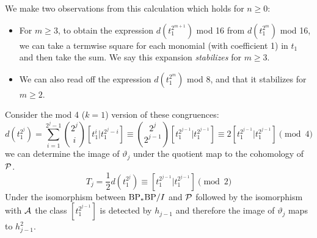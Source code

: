 \begin{exm}
We make two observations from this calculation which holds for $n \geq 0$: 
\begin{itemize}
\item For $m \geq 3$, to obtain the expression $d(t_1^{2^{m+1}})$ mod 16 from $d(t_1^{2^{m}})$ mod 16, we can take a termwise square for each monomial (with coefficient 1)  in $t_1$ and then take the sum. We say this expansion \emph{stabilizes} for $m \geq 3$.

\item We can also read off the expression $d(t_1^{2^{m}})$ mod 8, and that it stabilizes for $m \geq 2$.
\end{itemize}  
  
\end{exm}


\begin{exm}\label{exm:vartheta-hj2}
  Consider the mod 4 ($k=1$) version of these congruences:
$$d(t_1^{2^{j}}) = \sum_{i=1}^{2^{j} -1} \binom{2^{j}}{i} [t_1^i | t_1^{2^{j} - i}] \equiv \binom{2^{j}}{2^{j-1}}[t_1^{2^{j-1}} | t_1^{2^{j-1}}] \equiv 2[t_1^{2^{j-1}} | t_1^{2^{j-1}}] \pmod{4}$$
  we can determine the image of $\vartheta_j$ under the quotient map to the cohomology of $\P$.
  \[ T_j = \frac{1}{2} d(t_1^{2^j}) \equiv [t_1^{2^{j-1}} | t_1^{2^{j-1}}] \pmod{2} \]
  Under the isomorphism between $\BP_*\BP/I$ and $\P$ followed by the isomorphism with $\A$ the class
  $[t_1^{2^{j-1}}]$ is detected by $h_{j-1}$ and therefore the image of $\vartheta_j$ maps to $h_{j-1}^2$.
\end{exm}



